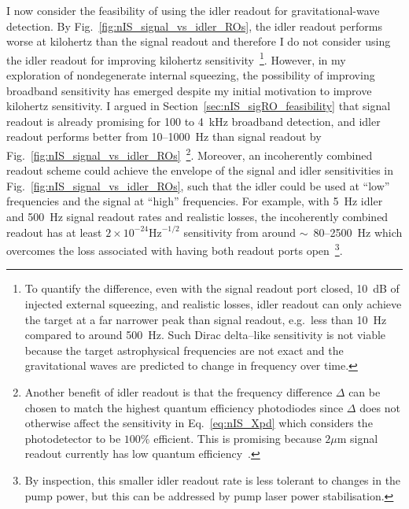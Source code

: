 I now consider the feasibility of using the idler readout for gravitational-wave detection. By Fig.~\ref{fig:nIS_signal_vs_idler_ROs}, the idler readout performs worse at kilohertz than the signal readout and therefore I do not consider using the idler readout for improving kilohertz sensitivity~\footnote{To quantify the difference, even with the signal readout port closed, 10~dB of injected external squeezing, and realistic losses, idler readout can only achieve the target at a far narrower peak than signal readout, e.g.\ less than 10~Hz compared to around 500~Hz. Such Dirac delta--like sensitivity is not viable because the target astrophysical frequencies are not exact and the gravitational waves are predicted to change in frequency over time.}.
However, in my exploration of nondegenerate internal squeezing, the possibility of improving broadband sensitivity has emerged despite my initial motivation to improve kilohertz sensitivity. I argued in Section~\ref{sec:nIS_sigRO_feasibility} that signal readout is already promising for 100 to 4~kHz broadband detection, and idler readout performs better from 10--1000~Hz than signal readout by Fig.~\ref{fig:nIS_signal_vs_idler_ROs}~\footnote{Another benefit of idler readout is that the frequency difference $\Delta$ can be chosen to match the highest quantum efficiency photodiodes since $\Delta$ does not otherwise affect the sensitivity in Eq.~\ref{eq:nIS_Xpd} which considers the photodetector to be $100\%$ efficient. This is promising because $2 \mu\text{m}$ signal readout currently has low quantum efficiency~\cite{singh_2019}.}. %
Moreover, an incoherently combined readout scheme could achieve the envelope of the signal and idler sensitivities in Fig.~\ref{fig:nIS_signal_vs_idler_ROs}, such that the idler could be used at ``low'' frequencies and the signal at ``high'' frequencies. %
For example, with 5~Hz idler and 500~Hz signal readout rates and realistic losses, the incoherently combined readout has at least $2\times10^{-24}\text{Hz}^{-1/2}$ sensitivity from around $\sim$~80--2500~Hz which overcomes the loss associated with having both readout ports open~\footnote{By inspection, this smaller idler readout rate is less tolerant to changes in the pump power, but this can be addressed by pump laser power stabilisation.}.

